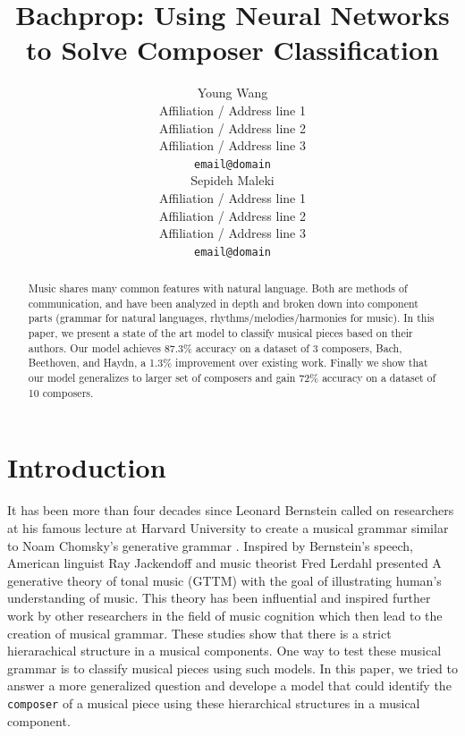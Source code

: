 \documentclass[11pt,a4paper]{article}
\title{Bachprop: Using Neural Networks to Solve Composer Classification}
\author{Young Wang \\
  Affiliation / Address line 1 \\
  Affiliation / Address line 2 \\
  Affiliation / Address line 3 \\
  {\tt email@domain} \\\And
  Sepideh Maleki \\
  Affiliation / Address line 1 \\
  Affiliation / Address line 2 \\
  Affiliation / Address line 3 \\
  {\tt email@domain} \\}
\date{}
\begin{document}
\maketitle
\begin{abstract}
Music shares many common features with natural language. Both are methods of communication, and have been analyzed in depth and broken down into component parts (grammar for natural languages, rhythms/melodies/harmonies for music). In this paper, we present a state of the art model to classify musical pieces based on their authors. Our model achieves 87.3\% accuracy on a dataset of 3 composers, Bach, Beethoven, and Haydn, a 1.3\% improvement over existing work. Finally we show that our model generalizes to larger set of composers and gain 72\% accuracy on a dataset of 10 composers.
\end{abstract}

\section{Introduction}

It has been more than four decades since Leonard Bernstein called on researchers at his famous lecture at Harvard University \cite{Bernstein} to create a musical grammar similar to Noam Chomsky's generative grammar \cite{Chomsky}. Inspired by Bernstein's speech, American linguist Ray Jackendoff and music theorist Fred Lerdahl presented A generative theory of tonal music (GTTM) with the goal of illustrating human's understanding of music.
This theory has been influential and inspired further work by other researchers in the field of music cognition which then lead to the creation of musical grammar. These studies show that there is a strict hierarachical structure in a musical components. One way to test these musical grammar is to classify musical pieces using such models. In this paper, we tried to answer a more generalized question and develope a model that could identify the \texttt{composer} of a musical piece using these hierarchical structures in a musical component.



\end{document}
